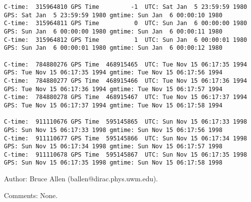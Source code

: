 {\begin{verbatim}
C-time:  315964810 GPS Time         -1  UTC: Sat Jan  5 23:59:59 1980 GPS: Sat Jan  5 23:59:59 1980 gmtime: Sun Jan  6 00:00:10 1980
C-time:  315964811 GPS Time          0  UTC: Sun Jan  6 00:00:00 1980 GPS: Sun Jan  6 00:00:00 1980 gmtime: Sun Jan  6 00:00:11 1980
C-time:  315964812 GPS Time          1  UTC: Sun Jan  6 00:00:01 1980 GPS: Sun Jan  6 00:00:01 1980 gmtime: Sun Jan  6 00:00:12 1980

C-time:  784880276 GPS Time  468915465  UTC: Tue Nov 15 06:17:35 1994 GPS: Tue Nov 15 06:17:35 1994 gmtime: Tue Nov 15 06:17:56 1994
C-time:  784880277 GPS Time  468915466  UTC: Tue Nov 15 06:17:36 1994 GPS: Tue Nov 15 06:17:36 1994 gmtime: Tue Nov 15 06:17:57 1994
C-time:  784880278 GPS Time  468915467  UTC: Tue Nov 15 06:17:37 1994 GPS: Tue Nov 15 06:17:37 1994 gmtime: Tue Nov 15 06:17:58 1994

C-time:  911110676 GPS Time  595145865  UTC: Sun Nov 15 06:17:33 1998 GPS: Sun Nov 15 06:17:33 1998 gmtime: Sun Nov 15 06:17:56 1998
C-time:  911110677 GPS Time  595145866  UTC: Sun Nov 15 06:17:34 1998 GPS: Sun Nov 15 06:17:34 1998 gmtime: Sun Nov 15 06:17:57 1998
C-time:  911110678 GPS Time  595145867  UTC: Sun Nov 15 06:17:35 1998 GPS: Sun Nov 15 06:17:35 1998 gmtime: Sun Nov 15 06:17:58 1998
\end{verbatim}
}
\begin{description}
\item{Author:}
Bruce Allen (ballen@dirac.phys.uwm.edu).
\item{Comments:}
None.
\end{description}


















\clearpage
